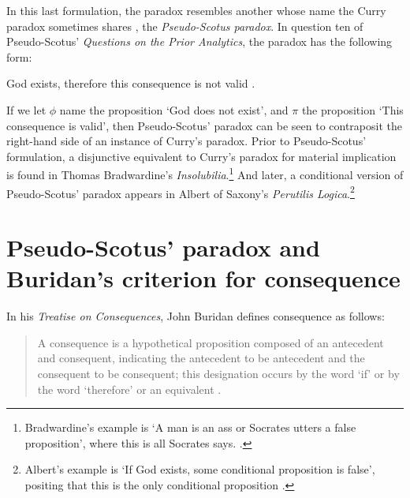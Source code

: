 	In this last formulation, the paradox resembles another whose name the Curry paradox sometimes shares \cite{PriestRoutley1982}, the \textit{Pseudo-Scotus paradox}. In question ten of Pseudo-Scotus' \textit{Questions on the Prior Analytics}, the paradox has the following form:
	
	\begin{center}
		God exists, therefore this consequence is not valid \cite[p. 227]{Pseudo-Scotus2001}.
	\end{center}
	
	If we let $\phi$ name the proposition `God does not exist', and $\pi$ the proposition `This consequence is valid', then Pseudo-Scotus' paradox can be seen to contraposit the right-hand side of an instance of Curry's paradox. Prior to Pseudo-Scotus' formulation, a disjunctive equivalent to Curry's paradox for material implication is found in Thomas Bradwardine's \textit{Insolubilia}.\footnote{Bradwardine's example is `A man is an ass or Socrates utters a false proposition', where this is all Socrates says. \cite[6.3, p. 97]{Bradwardine2010}.} And later, a conditional version of Pseudo-Scotus' paradox appears in Albert of Saxony's \textit{Perutilis Logica}.\footnote{Albert's example is `If God exists, some conditional proposition is false', positing that this is the only conditional proposition \cite[pp. 359-360]{Albert1988}.}
	
	\section[Buridan's criterion for consequence]{Pseudo-Scotus' paradox and Buridan's criterion for consequence}
	In his \textit{Treatise on Consequences}, John Buridan defines consequence as follows:
	\begin{quote}
		A consequence is a hypothetical proposition composed of an antecedent and consequent, indicating the antecedent to be antecedent and the consequent to be consequent; this designation occurs by the word `if' or by the word `therefore' or an equivalent \cite[I. 3, p. 67, alt.]{Buridan2015}.
	\end{quote}
	
